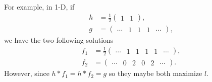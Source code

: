 For example, in 1-D, if
\begin{align*}
  h & = \frac{1}{2}
  \begin{pmatrix}
    1 & 1
  \end{pmatrix},\\
  g & =
  \begin{pmatrix}
    \cdots & 1 & 1 & 1 & \cdots
  \end{pmatrix},
\end{align*}
we have the two following solutions
\begin{align*}
  f_1 & = \frac{1}{2}
  \begin{pmatrix}
    \cdots & 1 & 1 & 1 & 1 & \cdots
  \end{pmatrix},\\
  f_2 & =
  \begin{pmatrix}
    \cdots & 0 & 2 & 0 & 2 & \cdots
  \end{pmatrix}.
\end{align*}
However, since $h * f_1 = h * f_2 = g$ so they maybe both maximize $l$.

